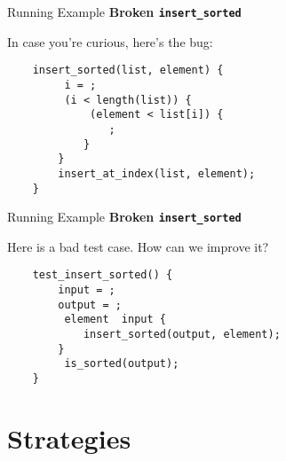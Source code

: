 \documentclass[xcolor=dvipsnames]{beamer}
\begin{document}
\begin{frame}{Running Example}
	\textbf{Broken \texttt{insert\_sorted}}

	\linegap
	In case you're curious, here's the bug:

	\linegap
		\texttt{~~~~insert\_sorted(list,~element)~\{} \\
			\texttt{~~~~~~~~~i~=~;} \\
		\texttt{~~~~~~~~~(i~<~length(list))~\{~} \\
		\texttt{~~~~~~~~~~~~~(element~<~list[i])~\{} \\
		\texttt{~~~~~~~~~~~~~~~~;} \\
		\texttt{~~~~~~~~~~~~\}} \\
		\texttt{~~~~~~~~\}} \\
		\texttt{~~~~~~~~insert\_at\_index(list,~element);} \\
		\texttt{~~~~\}} \\
\end{frame}

\begin{frame}{Running Example}
	\textbf{Broken \texttt{insert\_sorted}}

	\linegap
	Here is a bad test case. How can we improve it?

	\linegap
		\texttt{~~~~test\_insert\_sorted()~\{} \\
		\texttt{~~~~~~~~input~=~;} \\
		\texttt{~~~~~~~~output~=~;} \\
		\texttt{~~~~~~~~~element~~input~\{} \\
		\texttt{~~~~~~~~~~~~insert\_sorted(output,~element);} \\
		\texttt{~~~~~~~~\}} \\
		\texttt{~~~~~~~~~is\_sorted(output);} \\
		\texttt{~~~~\}} \\
\end{frame}

\section{Strategies}
\end{document}
